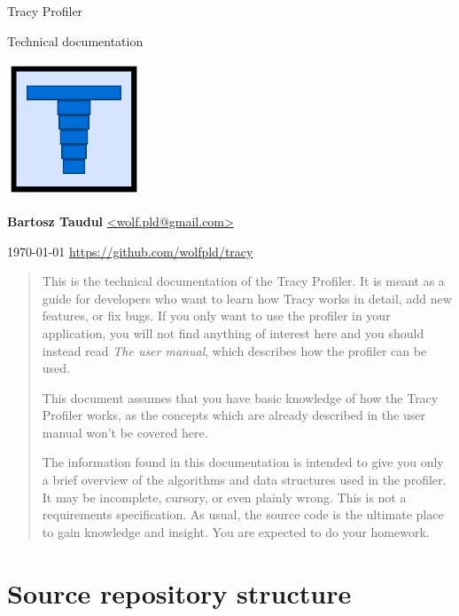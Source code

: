 \documentclass[hidelinks,titlepage,a4paper]{article}
\begin{document}
\begin{titlepage}
\centering
{\fontsize{120}{140}\selectfont Tracy Profiler}

\vspace{50pt} {\Huge{}\selectfont Technical documentation}

\vfill \includegraphics[height=40mm]{../icon/icon}

\vfill
\large\textbf{Bartosz Taudul} \href{mailto:wolf.pld@gmail.com}{<wolf.pld@gmail.com>}

\vspace{10pt}
\today
\vfill
\url{https://github.com/wolfpld/tracy}
\end{titlepage}

\begin{abstract}
This is the technical documentation of the Tracy Profiler. It is meant as a guide for developers who want to learn how Tracy works in detail, add new features, or fix bugs. If you only want to use the profiler in your application, you will not find anything of interest here and you should instead read \emph{The user manual}, which describes how the profiler can be used.

This document assumes that you have basic knowledge of how the Tracy Profiler works, as the concepts which are already described in the user manual won't be covered here.

The information found in this documentation is intended to give you only a brief overview of the algorithms and data structures used in the profiler. It may be incomplete, cursory, or even plainly wrong. This is not a requirements specification. As usual, the source code is the ultimate place to gain knowledge and insight. You are expected to do your homework.
\end{abstract}

\tableofcontents

\newpage

\section{Source repository structure}
\end{document}
